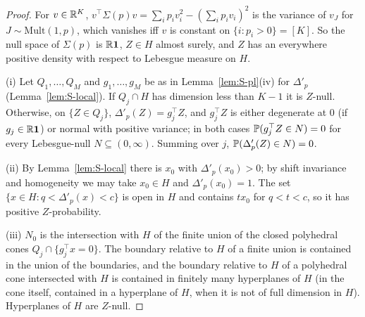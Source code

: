 \begin{proof}
For $v\in\mathbb{R}^K$, $v^\top\Sigma(p)v=\sum_ip_iv_i^2-(\sum_ip_iv_i)^2$ is the variance of $v_J$ for $J\sim\mathrm{Mult}(1,p)$, which vanishes iff $v$ is constant on $\{i:p_i>0\}=[K]$. So the null space of $\Sigma(p)$ is $\mathbb{R}\mathbf{1}$, $Z\in H$ almost surely, and $Z$ has an everywhere positive density with respect to Lebesgue measure on $H$.

(i) Let $Q_1,\dots,Q_M$ and $g_1,\dots,g_M$ be as in Lemma~\ref{lem:S-pl}(iv) for $\Delta'_p$ (Lemma~\ref{lem:S-local}). If $Q_j\cap H$ has dimension less than $K-1$ it is $Z$-null. Otherwise, on $\{Z\in Q_j\}$, $\Delta'_p(Z)=g_j^\top Z$, and $g_j^\top Z$ is either degenerate at $0$ (if $g_j\in\mathbb{R}\mathbf{1}$) or normal with positive variance; in both cases $\mathbb{P}(g_j^\top Z\in N)=0$ for every Lebesgue-null $N\subseteq(0,\infty)$. Summing over $j$, $\mathbb{P}(\Delta'_p(Z)\in N)=0$.

(ii) By Lemma~\ref{lem:S-local} there is $x_0$ with $\Delta'_p(x_0)>0$; by shift invariance and homogeneity we may take $x_0\in H$ and $\Delta'_p(x_0)=1$. The set $\{x\in H:q<\Delta'_p(x)<c\}$ is open in $H$ and contains $tx_0$ for $q<t<c$, so it has positive $Z$-probability.

(iii) $N_0$ is the intersection with $H$ of the finite union of the closed polyhedral cones $Q_j\cap\{g_j^\top x=0\}$. The boundary relative to $H$ of a finite union is contained in the union of the boundaries, and the boundary relative to $H$ of a polyhedral cone intersected with $H$ is contained in finitely many hyperplanes of $H$ (in the cone itself, contained in a hyperplane of $H$, when it is not of full dimension in $H$). Hyperplanes of $H$ are $Z$-null.
\end{proof}

